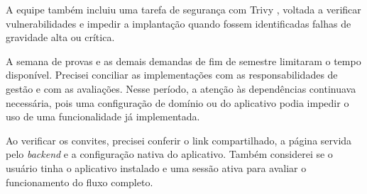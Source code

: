 A equipe também incluiu uma tarefa de segurança com Trivy
\cite{trivy-docs}, voltada a verificar vulnerabilidades e impedir a
implantação quando fossem identificadas falhas de gravidade alta ou crítica.

A semana de provas e as demais demandas de fim de semestre limitaram o
tempo disponível. Precisei conciliar as implementações com as
responsabilidades de gestão e com as avaliações. Nesse período, a atenção
às dependências continuava necessária, pois uma configuração de domínio ou
do aplicativo podia impedir o uso de uma funcionalidade já implementada.

Ao verificar os convites, precisei conferir o link compartilhado, a página
servida pelo \textit{backend} e a configuração nativa do aplicativo. Também
considerei se o usuário tinha o aplicativo instalado e uma sessão ativa
para avaliar o funcionamento do fluxo completo.
